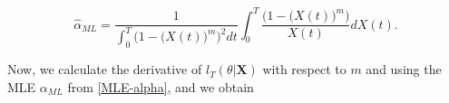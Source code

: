 \documentclass[12pt, reqno]{amsart}
\newcommand{\fer}[1]{{\textcolor{blue}{#1}}}
\newcommand{\1}{{\bf 1}}
\newcommand{\2}{{\bf 2}}
\theoremstyle{definition}
\theoremstyle{remark}
\numberwithin{equation}{section}
\begin{document}

\begin{equation}\label{MLE-alpha}
\hat{\alpha}_{ML}= \frac{1}{\int_0^T  \big(1-\big(X(t)\big)^m\big)^2   dt  }  \int_0^T \frac{ \big(1-\big(X(t)\big)^m\big)  }{X(t)}  dX(t).  
\end{equation}





Now, we calculate the derivative of $l_T(\theta|\bm X)$ with respect to $m$ and using the MLE $\alpha_{ML}$ from \eqref{MLE-alpha}, and we obtain

 



 
 
\end{document}
